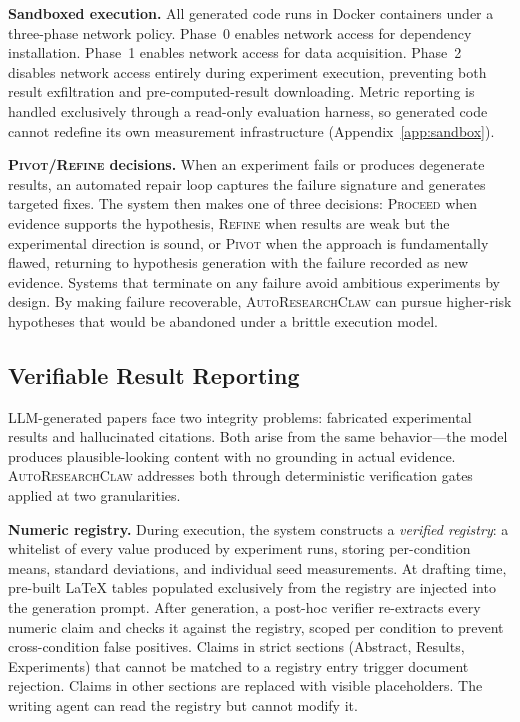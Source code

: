 \documentclass{llmxive}
\providecommand{\system}{\textsc{AutoResearchClaw}}
\begin{document}
\noindent \textbf{Sandboxed execution.}
All generated code runs in Docker containers under a three-phase network policy.
Phase~0 enables network access for dependency installation.
Phase~1 enables network access for data acquisition.
Phase~2 disables network access entirely during experiment execution, preventing both result exfiltration and pre-computed-result downloading.
Metric reporting is handled exclusively through a read-only evaluation harness, so generated code cannot redefine its own measurement infrastructure (Appendix~\ref{app:sandbox}).

\noindent \textbf{\textsc{Pivot}/\textsc{Refine} decisions.}
When an experiment fails or produces degenerate results, an automated repair loop captures the failure signature and generates targeted fixes.
The system then makes one of three decisions: \textsc{Proceed} when evidence supports the hypothesis, \textsc{Refine} when results are weak but the experimental direction is sound, or \textsc{Pivot} when the approach is fundamentally flawed, returning to hypothesis generation with the failure recorded as new evidence.
Systems that terminate on any failure avoid ambitious experiments by design.
By making failure recoverable, \system{} can pursue higher-risk hypotheses that would be abandoned under a brittle execution model.

\vspace{-0.3em}
\subsection{Verifiable Result Reporting}
\label{sec:verification}
\vspace{-0.3em}

LLM-generated papers face two integrity problems: fabricated experimental results and hallucinated citations.
Both arise from the same behavior---the model produces plausible-looking content with no grounding in actual evidence.
\system{} addresses both through deterministic verification gates applied at two granularities.

\noindent \textbf{Numeric registry.}
During execution, the system constructs a \emph{verified registry}: a whitelist of every value produced by experiment runs, storing per-condition means, standard deviations, and individual seed measurements.
At drafting time, pre-built \LaTeX{} tables populated exclusively from the registry are injected into the generation prompt.
After generation, a post-hoc verifier re-extracts every numeric claim and checks it against the registry, scoped per condition to prevent cross-condition false positives.
Claims in strict sections (Abstract, Results, Experiments) that cannot be matched to a registry entry trigger document rejection.
Claims in other sections are replaced with visible placeholders.
The writing agent can read the registry but cannot modify it.
\end{document}
